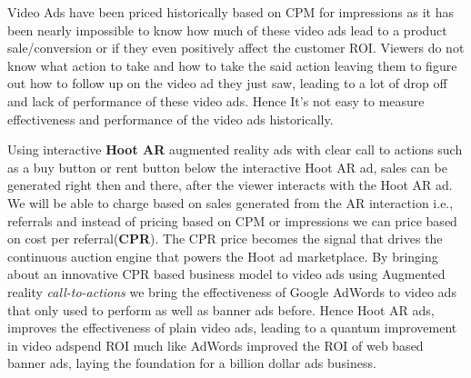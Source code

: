 Video Ads have been priced historically based on CPM for impressions as it has been nearly impossible to know how much of these video ads lead to a product sale/conversion or if they even positively affect the customer ROI. Viewers do not know what action to take and how to take the said action leaving them to figure out how to follow up on the video ad they just saw, leading to a lot of drop off and lack of performance of these video ads. Hence It’s not easy  to measure effectiveness and performance of the video ads historically.

Using interactive \textbf{Hoot AR} augmented reality  ads with clear
call to actions such as a buy button or rent button below the
interactive Hoot AR ad, sales can be generated right then and there,
after the viewer interacts with the Hoot AR ad. We will be able to
charge based on sales generated from the AR interaction i.e.,
referrals and instead of pricing based on CPM or impressions we can
price based on  cost per referral(\textbf{CPR}). The CPR price becomes
the signal that drives the continuous auction engine that powers the
Hoot ad marketplace. By bringing about an innovative CPR based
business model to video ads using Augmented reality
\emph{call-to-actions} we bring the effectiveness of Google AdWords to
video ads that only used to perform as well as banner ads
before. Hence Hoot AR ads, improves the effectiveness of plain video
ads, leading to a quantum improvement in video adspend ROI much like
AdWords improved the ROI of web based banner ads, laying the
foundation for a billion dollar ads business.
